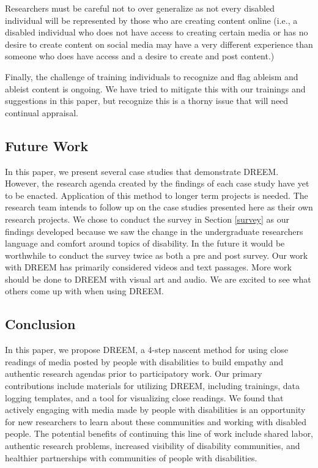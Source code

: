 Researchers must be careful not to over generalize as not every disabled individual will be represented by those who are creating content online (i.e., a disabled individual who does not have access to creating certain media or has no desire to create content on social media may have a very different experience than someone who does have access and a desire to create and post content.) %

Finally, the challenge of training individuals to recognize and flag ableism and ableist content is ongoing. We have tried to mitigate this with our trainings and suggestions in this paper, but recognize this is a thorny issue that will need continual appraisal.

\subsection{Future Work}
In this paper, we present several case studies that demonstrate DREEM. However, the research agenda created by the findings of each case study have yet to be enacted. Application of this method to longer term projects is needed. The research team intends to follow up on the case studies presented here as their own research projects. We chose to conduct the survey in Section \ref{survey} as our findings developed because we saw the change in the undergraduate researchers language and comfort around topics of disability. 
In the future it would be worthwhile to conduct the survey twice as both a pre and post survey. Our work with DREEM has primarily considered videos and text passages. More work should be done to DREEM with visual art and audio. We are excited to see what others come up with when using DREEM. 

\subsection{Conclusion}
In this paper, we propose DREEM, a 4-step nascent method for using close readings of media posted by people with disabilities to build empathy and authentic research agendas prior to participatory work. Our primary contributions include materials for utilizing DREEM, including trainings, data logging templates, and a tool for visualizing close readings. We found that actively engaging with media made by people with disabilities is an opportunity for new researchers to learn about these communities and working with disabled people. The potential benefits of continuing this line of work include shared labor, authentic research problems, increased visibility of disability communities, and healthier partnerships with communities of people with disabilities. 

